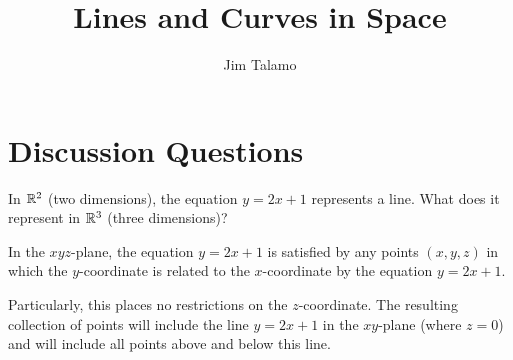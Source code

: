 \documentclass[noauthor, handout]{ximera}
\author{Jim Talamo}
\title[]{Lines and Curves in Space}
\begin{document}
\begin{abstract}
\end{abstract}
\maketitle

\vspace{-0.5in}

\section{Discussion Questions}

\begin{problem}
In $\mathbb R^2$ (two dimensions), the equation $y=2x+1$ represents a line.  What does it represent in $\mathbb R^3$ (three dimensions)?

\begin{freeResponse}
In the $xyz$-plane, the equation $y=2x+1$ is satisfied by any points $(x,y,z)$ in which the $y$-coordinate is related to the $x$-coordinate by the equation $y=2x+1$.  

Particularly, this places no restrictions on the $z$-coordinate.  The resulting collection of points will include the line $y=2x+1$ in the $xy$-plane (where $z=0$) and will include all points above and below this line.

\begin{image}
\end{image}
\end{freeResponse}
\end{problem}
\end{document}
